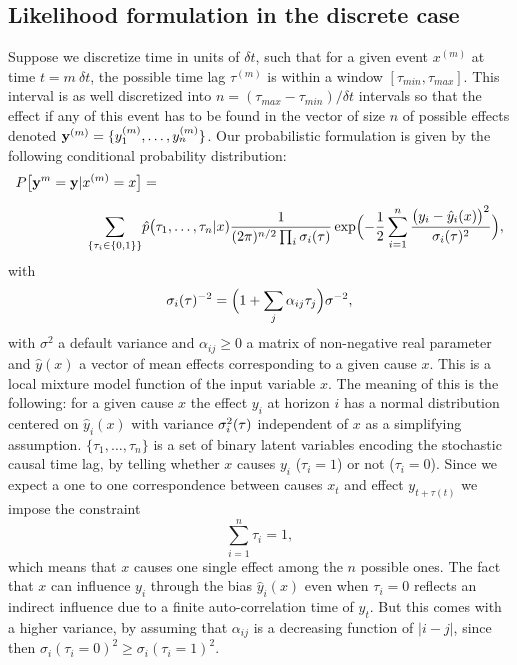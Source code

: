 \documentclass[envcountsect,runningheads]{llncs}
\theoremstyle{etoile}
\begin{document}
\subsection{Likelihood formulation in the discrete case}
Suppose we discretize time in units of $\delta t$, such that for a given event $x^{(m)}$ at time  $t = m\ \delta t$, the possible time lag $\tau^{(m)}$ is within a window
$[\tau_{min},\tau_{max}]$. This interval is as well discretized into $n = (\tau_{max}-\tau_{min})/\delta t $ intervals so that the effect if any of this event has to be found in the vector of size $n$ of
possible effects denoted ${\bf y}^{(m)} = \{y_1^{(m)},\ldots,y_n^{(m)}\}$.
Our probabilistic formulation is given by the following conditional probability distribution:
\begin{align}
  P\bigl[{\bf y}^{m} = {\bf y}\vert x^{(m)}=x\bigr] &= \nonumber\\[0.2cm]
  \sum_{\{\tau_i\in\{0,1\}\}} & \hat p\bigl(\tau_1,\ldots,\tau_n\vert x)
\frac{1}{(2\pi)^{n/2}\prod_i\sigma_i({\bf \tau})}
\exp\Bigl(-\frac{1}{2}\sum_{i=1}^n\frac{\bigl(y_i-\hat y_i(x)\bigr)^2}{\sigma_i({\bf \tau})^2}\Bigr),\label{eq:py}
\end{align}
with 
\[
\sigma_i({\bf \tau})^{-2} = \Bigl(1+\sum_j\alpha_{ij} \tau_j\Bigr)\sigma^{-2},
\]
with $\sigma^2$ a default variance and $\alpha_{ij}\ge 0$ a matrix of non-negative real parameter and $\hat y(x)$ a vector of mean effects corresponding to a given cause $x$. 
This is a local mixture model function of the input variable $x$.
The meaning of this is the following: for a given cause $x$ the effect
$y_i$ at horizon $i$ has a normal distribution centered on $\hat y_i(x)$ with  variance $\sigma_i^2({\bf \tau})$ independent of $x$ as a simplifying assumption. $\{\tau_1,\ldots,\tau_n\}$ is a set of binary
latent variables encoding the stochastic causal time lag, by telling whether $x$ causes $y_i$ ($\tau_i=1$) or not ($\tau_i=0$). Since we expect a one to one correspondence between causes
$x_t$ and effect $y_{t+\tau(t)}$ we impose the constraint
\begin{equation}\label{eq:cs1}
\sum_{i=1}^n \tau_i = 1,
\end{equation}
which means that $x$ causes one single effect among the $n$ possible ones. The fact that $x$ can influence $y_i$ through the bias $\hat y_i(x)$ even when $\tau_i=0$ reflects an indirect
influence due to a finite auto-correlation time of $y_t$. But this comes with a higher variance, by assuming that $\alpha_{ij}$ is a decreasing function of $\vert i-j\vert$, 
since then $\sigma_i(\tau_i=0)^2\ge \sigma_i(\tau_i=1)^2$.
\end{document}
